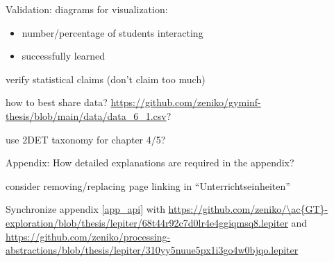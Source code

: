 \begin{todo}
\item Validation: diagrams for visualization:
\begin{itemize}
\item number/percentage of students interacting
\item successfully learned
\end{itemize}
\item verify statistical claims (don't claim too much)
\item how to best share data? \url{https://github.com/zeniko/gyminf-thesis/blob/main/data/data_6_1.csv}?
\item use 2DET taxonomy for chapter 4/5? \cite{Sor13}
\item Appendix: How detailed explanations are required in the appendix?
\item consider removing/replacing page linking in ``Unterrichtseinheiten''
\item Synchronize appendix \ref{app_api} with \url{https://github.com/zeniko/\ac{GT}-exploration/blob/thesis/lepiter/68t44r92c7d0lr4e4ggiqmsq8.lepiter} and \url{https://github.com/zeniko/processing-abstractions/blob/thesis/lepiter/310yy5nuue5px1i3go4w0bjqo.lepiter}
\end{todo}
